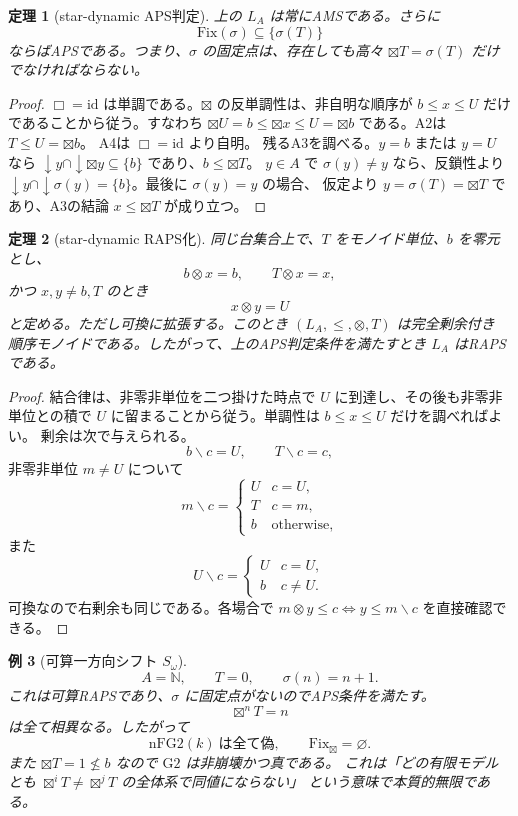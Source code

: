 \documentclass[uplatex,dvipdfmx,a4paper,10pt]{jsarticle}
\newtheorem{theorem}{定理}
\newtheorem{example}[theorem]{例}
\newcommand{\Gtwo}{\mathrm{G2}}
\newcommand{\nFGtwo}{\mathrm{nFG2}}
\newcommand{\Fix}{\mathrm{Fix}}
\newcommand{\bt}{\boxtimes}
\newcommand{\resl}{\backslash}
\begin{document}
\begin{theorem}[star-dynamic APS判定]
上の \(L_A\) は常にAMSである。さらに
\[
\Fix(\sigma)\subseteq\{\sigma(T)\}
\]
ならばAPSである。つまり、\(\sigma\) の固定点は、存在しても高々
\(\bt T=\sigma(T)\) だけでなければならない。
\end{theorem}

\begin{proof}
\(\Box=\mathrm{id}\) は単調である。\(\bt\) の反単調性は、非自明な順序が
\(b\le x\le U\) だけであることから従う。すなわち
\(\bt U=b\le\bt x\le U=\bt b\) である。A2は \(T\le U=\bt b\)。
A4は \(\Box=\mathrm{id}\) より自明。
残るA3を調べる。\(y=b\) または \(y=U\) なら
\(\downarrow y\cap\downarrow\bt y\subseteq\{b\}\) であり、\(b\le\bt T\)。
\(y\in A\) で \(\sigma(y)\ne y\) なら、反鎖性より
\(\downarrow y\cap\downarrow\sigma(y)=\{b\}\)。最後に \(\sigma(y)=y\) の場合、
仮定より \(y=\sigma(T)=\bt T\) であり、A3の結論 \(x\le\bt T\) が成り立つ。
\end{proof}

\begin{theorem}[star-dynamic RAPS化]
同じ台集合上で、\(T\) をモノイド単位、\(b\) を零元とし、
\[
b\otimes x=b,\qquad T\otimes x=x,
\]
かつ \(x,y\ne b,T\) のとき
\[
x\otimes y=U
\]
と定める。ただし可換に拡張する。このとき \((L_A,\le,\otimes,T)\) は完全剰余付き
順序モノイドである。したがって、上のAPS判定条件を満たすとき \(L_A\) はRAPSである。
\end{theorem}

\begin{proof}
結合律は、非零非単位を二つ掛けた時点で \(U\) に到達し、その後も非零非単位との積で
\(U\) に留まることから従う。単調性は \(b\le x\le U\) だけを調べればよい。
剰余は次で与えられる。
\[
b\resl c=U,\qquad T\resl c=c,
\]
非零非単位 \(m\ne U\) について
\[
m\resl c=
\begin{cases}
U & c=U,\\
T & c=m,\\
b & \text{otherwise},
\end{cases}
\]
また
\[
U\resl c=
\begin{cases}
U & c=U,\\
b & c\ne U.
\end{cases}
\]
可換なので右剰余も同じである。各場合で
\(m\otimes y\le c\iff y\le m\resl c\) を直接確認できる。
\end{proof}

\begin{example}[可算一方向シフト \(S_\omega\)]
\[
A=\mathbb N,\qquad T=0,\qquad \sigma(n)=n+1.
\]
これは可算RAPSであり、\(\sigma\) に固定点がないのでAPS条件を満たす。
\[
\bt^nT=n
\]
は全て相異なる。したがって
\[
\nFGtwo(k)\ \text{は全て偽},\qquad \Fix_{\bt}=\varnothing.
\]
また \(\bt T=1\not\le b\) なので \(\Gtwo\) は非崩壊かつ真である。
これは「どの有限モデルとも \(\bt^iT\ne\bt^jT\) の全体系で同値にならない」
という意味で本質的無限である。
\end{example}
\end{document}
